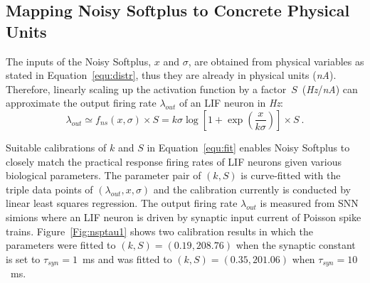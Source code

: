 \documentclass{article}
\begin{document}
\subsection{Mapping Noisy Softplus to Concrete Physical Units}
\label{sec:af_model}
The inputs of the Noisy Softplus, $x$ and $\sigma$, are obtained from physical variables as stated in Equation~\ref{equ:distr}, thus they are already in physical units (\textit{nA}).
Therefore, linearly scaling up the activation function by a factor~$S$~(\textit{Hz}/\textit{nA}) can approximate the output firing rate $\lambda_{out}$ of an LIF neuron in \textit{Hz}:
\begin{equation}
\lambda_{out} \simeq f_{ns}(x, \sigma) \times S = k \sigma \log [1 + \exp(\frac{x}{k \sigma})] \times S~.
\label{equ:fit}
\end{equation}	


Suitable calibrations of $k$ and $S$ in Equation~\ref{equ:fit} enables Noisy Softplus to closely match the practical response firing rates of LIF neurons given various biological parameters.
The parameter pair of $(k, S)$ is curve-fitted with the triple data points of $(\lambda_{out}, x, \sigma)$ and the calibration currently is conducted by linear least squares regression.
The output firing rate $\lambda_{out}$ is measured from SNN simions where an LIF neuron is driven by synaptic input current of Poisson spike trains.
Figure~\ref{Fig:nsptau1} shows two calibration results in which 
the parameters were fitted to $(k, S)=(0.19,208.76)$ when the synaptic constant is set to $\tau_{syn}=1$~ms and was fitted to $(k, S)=(0.35,201.06)$ when $\tau_{syn}=10$~ms.
\end{document}
